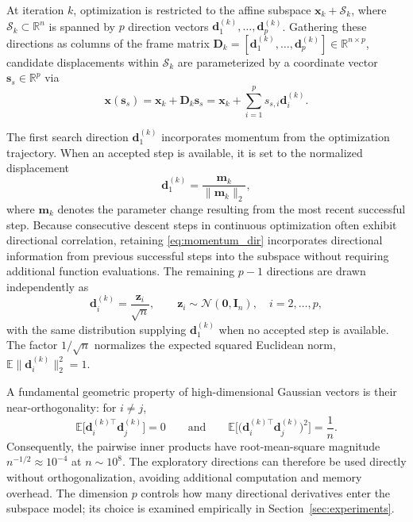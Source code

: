 \documentclass{siamart171218}
\newcommand{\bx}{\bm{x}}
\newcommand{\bd}{\bm{d}}
\newcommand{\bz}{\bm{z}}
\newcommand{\bs}{\bm{s}}
\begin{document}
At iteration $k$, optimization is restricted to the affine subspace $\bx_k + \mathcal{S}_k$, where $\mathcal{S}_k \subset \mathbb{R}^n$ is spanned by $p$ direction vectors $\bd_1^{(k)}, \ldots, \bd_p^{(k)}$. Gathering these directions as columns of the frame matrix $\bm D_k = [\bd_1^{(k)}, \ldots, \bd_p^{(k)}] \in \mathbb{R}^{n \times p}$, candidate displacements within $\mathcal{S}_k$ are parameterized by a coordinate vector $\bs_s \in \mathbb{R}^p$ via
\begin{equation}
\bx(\bs_s) = \bx_k + \bm D_k \bs_s = \bx_k + \sum_{i=1}^p s_{s,i} \bd_i^{(k)}.
\label{eq:subspace_param}
\end{equation}

The first search direction $\bd_1^{(k)}$ incorporates momentum from the optimization trajectory. When an accepted step is available, it is set to the normalized displacement
\begin{equation}
\bd_1^{(k)} = \frac{\bm m_k}{\|\bm m_k\|_2},
\label{eq:momentum_dir}
\end{equation}
where $\bm m_k$ denotes the parameter change resulting from the most recent successful step. Because consecutive descent steps in continuous optimization often exhibit directional correlation, retaining \eqref{eq:momentum_dir} incorporates directional information from previous successful steps into the subspace without requiring additional function evaluations. The remaining $p-1$ directions are drawn independently as
\begin{equation}
\bd_i^{(k)} = \frac{\bz_i}{\sqrt{n}}, \qquad \bz_i \sim \mathcal{N}(\bm{0}, \bm{I}_n), \quad i = 2, \ldots, p,
\label{eq:random_dirs}
\end{equation}
with the same distribution supplying $\bd_1^{(k)}$ when no accepted step is available. The factor $1/\sqrt{n}$ normalizes the expected squared Euclidean norm, $\mathbb E\|\bd_i^{(k)}\|_2^2 = 1$.

A fundamental geometric property of high-dimensional Gaussian vectors is their near-orthogonality: for $i \ne j$,
\begin{equation}
\mathbb E\bigl[\bd_i^{(k)\top} \bd_j^{(k)}\bigr] = 0
\qquad\text{and}\qquad
\mathbb E\bigl[ \bigl(\bd_i^{(k)\top} \bd_j^{(k)}\bigr)^2 \bigr] = \frac{1}{n}.
\label{eq:near_ortho}
\end{equation}
Consequently, the pairwise inner products have root-mean-square magnitude $n^{-1/2} \approx 10^{-4}$ at $n \sim 10^8$. The exploratory directions can therefore be used directly without orthogonalization, avoiding additional computation and memory overhead. The dimension $p$ controls how many directional derivatives enter the subspace model; its choice is examined empirically in Section~\ref{sec:experiments}.
\end{document}
